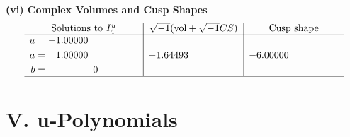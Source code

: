 \documentclass[1p]{elsarticle_modified}
\theoremstyle{definition}
\newcommand{\I}{\sqrt{-1}}
\begin{document}
\newpage\flushleft \textbf{(vi) Complex Volumes and Cusp Shapes}
$$\begin{array}{c|c|c}  
\text{Solutions to }I^u_{4}& \I (\text{vol} + \sqrt{-1}CS) & \text{Cusp shape}\\
 \hline 
\begin{aligned}
u &= -1.00000\phantom{ +0.000000I} \\
a &= \phantom{-}1.00000\phantom{ +0.000000I} \\
b &= \phantom{-0.000000 } 0\end{aligned}
 & -1.64493\phantom{ +0.000000I} & -6.00000\phantom{ +0.000000I}\\
 \hline 
 \end{array}$$\newpage
\newpage\renewcommand{\arraystretch}{1}
\centering \section*{ V. u-Polynomials}
\end{document}
